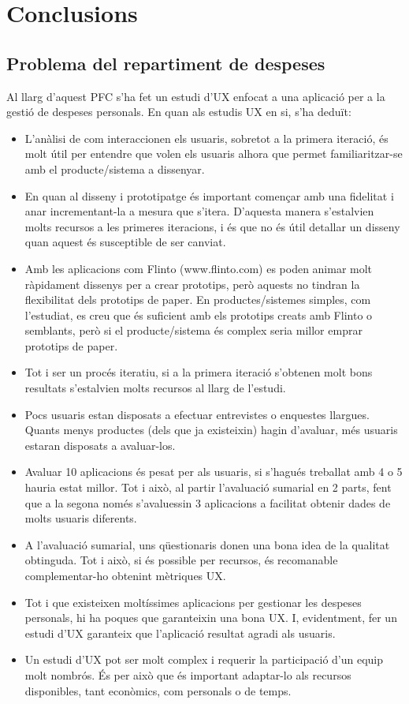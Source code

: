 \chapter{Conclusions}

\section{Problema del repartiment de despeses}
Al llarg d'aquest \ac{PFC} s'ha fet un estudi d'\ac{UX} enfocat a una aplicació per a la gestió de despeses personals. En quan als estudis \ac{UX} en si, s'ha deduït:

\begin{itemize}
\item L'anàlisi de com interaccionen els usuaris, sobretot a la primera iteració, és molt útil per entendre que volen els usuaris alhora que permet familiaritzar-se amb el producte/sistema a dissenyar.
\item En quan al disseny i prototipatge és important començar amb una fidelitat i anar incrementant-la a mesura que s'itera. D'aquesta manera s'estalvien molts recursos a les primeres iteracions, i és que no és útil detallar un disseny quan aquest és susceptible de ser canviat. %
\item Amb les aplicacions com Flinto (www.flinto.com) es poden animar molt ràpidament dissenys per a crear prototips, però aquests no tindran la flexibilitat dels prototips de paper. En productes/sistemes simples, com l'estudiat, es creu que és suficient amb els prototips creats amb Flinto o semblants, però si el producte/sistema és complex seria millor emprar prototips de paper.
\item Tot i ser un procés iteratiu, si a la primera iteració s'obtenen molt bons resultats s'estalvien molts recursos al llarg de l'estudi. 
\item Pocs usuaris estan disposats a efectuar entrevistes o enquestes llargues. Quants menys productes (dels que ja existeixin) hagin d'avaluar, més usuaris estaran disposats a avaluar-los. 
\item Avaluar 10 aplicacions és pesat per als usuaris, si s'hagués treballat amb 4 o 5 hauria estat millor. Tot i això, al partir l'avaluació sumarial en 2 parts, fent que a la segona només s'avaluessin 3 aplicacions a facilitat obtenir dades de molts usuaris diferents. 
\item A l'avaluació sumarial, uns qüestionaris donen una bona idea de la qualitat obtinguda. Tot i això, si és possible per recursos, és recomanable complementar-ho obtenint mètriques \ac{UX}.
\item Tot i que existeixen moltíssimes aplicacions per gestionar les despeses personals, hi ha poques que garanteixin una bona \ac{UX}. I, evidentment, fer un estudi d'\ac{UX} garanteix que l'aplicació resultat agradi als usuaris. 
\item Un estudi d'\ac{UX} pot ser molt complex i requerir la participació d'un equip molt nombrós. És per això que és important adaptar-lo als recursos disponibles, tant econòmics, com personals o de temps. 
\end{itemize}

